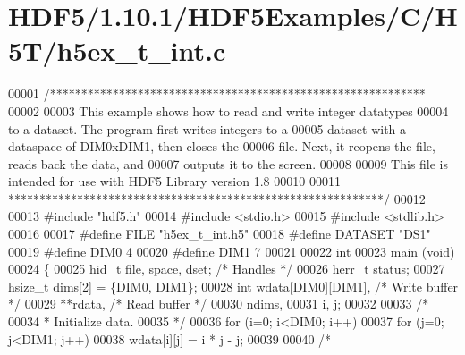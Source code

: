 \hypertarget{_h_d_f5_21_810_81_2_h_d_f5_examples_2_c_2_h5_t_2h5ex__t__int_8c_source}{}\section{H\+D\+F5/1.10.1/\+H\+D\+F5\+Examples/\+C/\+H5\+T/h5ex\+\_\+t\+\_\+int.c}
\label{_h_d_f5_21_810_81_2_h_d_f5_examples_2_c_2_h5_t_2h5ex__t__int_8c_source}

\begin{DoxyCode}
00001 \textcolor{comment}{/************************************************************}
00002 \textcolor{comment}{}
00003 \textcolor{comment}{  This example shows how to read and write integer datatypes}
00004 \textcolor{comment}{  to a dataset.  The program first writes integers to a}
00005 \textcolor{comment}{  dataset with a dataspace of DIM0xDIM1, then closes the}
00006 \textcolor{comment}{  file.  Next, it reopens the file, reads back the data, and}
00007 \textcolor{comment}{  outputs it to the screen.}
00008 \textcolor{comment}{}
00009 \textcolor{comment}{  This file is intended for use with HDF5 Library version 1.8}
00010 \textcolor{comment}{}
00011 \textcolor{comment}{ ************************************************************/}
00012 
00013 \textcolor{preprocessor}{#include "hdf5.h"}
00014 \textcolor{preprocessor}{#include <stdio.h>}
00015 \textcolor{preprocessor}{#include <stdlib.h>}
00016 
00017 \textcolor{preprocessor}{#define FILE            "h5ex\_t\_int.h5"}
00018 \textcolor{preprocessor}{#define DATASET         "DS1"}
00019 \textcolor{preprocessor}{#define DIM0            4}
00020 \textcolor{preprocessor}{#define DIM1            7}
00021 
00022 \textcolor{keywordtype}{int}
00023 main (\textcolor{keywordtype}{void})
00024 \{
00025     hid\_t       \hyperlink{structfile}{file}, space, dset;          \textcolor{comment}{/* Handles */}
00026     herr\_t      status;
00027     hsize\_t     dims[2] = \{DIM0, DIM1\};
00028     \textcolor{keywordtype}{int}         wdata[DIM0][DIM1],          \textcolor{comment}{/* Write buffer */}
00029                 **rdata,                    \textcolor{comment}{/* Read buffer */}
00030                 ndims,
00031                 i, j;
00032 
00033     \textcolor{comment}{/*}
00034 \textcolor{comment}{     * Initialize data.}
00035 \textcolor{comment}{     */}
00036     \textcolor{keywordflow}{for} (i=0; i<DIM0; i++)
00037         \textcolor{keywordflow}{for} (j=0; j<DIM1; j++)
00038             wdata[i][j] = i * j - j;
00039 
00040     \textcolor{comment}{/*}

\end{DoxyCode}
